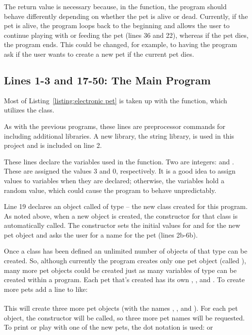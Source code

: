 The return value is necessary because, in the  function, the program should behave differently depending on whether the pet is alive or dead.  Currently, if the pet is alive, the program loops back to the beginning and allows the user to continue playing with or feeding the pet (lines 36 and 22), whereas if the pet dies, the program ends.  This could be changed, for example, to having the program ask if the user wants to create a new pet if the current pet dies.

\subsection{Lines 1-3 and 17-50: The Main Program}

Most of Listing~\ref{listing:electronic pet} is taken up with the  function, which utilizes the  class.

As with the previous programs, these lines are preprocessor commands for including additional libraries.  A new library, the string library, is used in this project and is included on line 2.


These lines declare the variables used in the  function.  Two are integers:  and .  These are assigned the values 3 and 0, respectively.  It is a good idea to assign values to variables when they are declared; otherwise, the variables hold a random value, which could cause the program to behave unpredictably.

Line 19 declares an object called  of type  -- the new class created for this program.  As noted above, when a new object is created, the constructor for that class is automatically called.  The constructor sets the initial values for  and  for the new pet object and asks the user for a name for the pet (lines 2b-6b).

Once a class has been defined an unlimited number of objects of that type can be created.  So, although currently the program creates only one pet object (called ), many more pet objects could be created just as many variables of type  can be created within a program.  Each pet that's created has its own , , and .
To create more pets add a line to  like:\\
\\
This will create three more pet objects (with the names , , and ).  For each pet object, the constructor will be called, so three more pet names will be requested.  To print or play with one of the new pets, the dot notation is used:  or \\  

